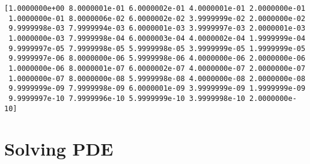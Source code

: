 \documentclass[11pt]{article}
\begin{document}
    \begin{Verbatim}[commandchars=\\\{\}]
[1.0000000e+00 8.0000001e-01 6.0000002e-01 4.0000001e-01 2.0000000e-01
 1.0000000e-01 8.0000006e-02 6.0000002e-02 3.9999999e-02 2.0000000e-02
 9.9999998e-03 7.9999994e-03 6.0000001e-03 3.9999997e-03 2.0000001e-03
 1.0000000e-03 7.9999998e-04 6.0000003e-04 4.0000002e-04 1.9999999e-04
 9.9999997e-05 7.9999998e-05 5.9999998e-05 3.9999999e-05 1.9999999e-05
 9.9999997e-06 8.0000000e-06 5.9999998e-06 4.0000000e-06 2.0000000e-06
 1.0000000e-06 8.0000001e-07 6.0000002e-07 4.0000000e-07 2.0000000e-07
 1.0000000e-07 8.0000000e-08 5.9999998e-08 4.0000000e-08 2.0000000e-08
 9.9999999e-09 7.9999998e-09 6.0000001e-09 3.9999999e-09 1.9999999e-09
 9.9999997e-10 7.9999996e-10 5.9999999e-10 3.9999998e-10 2.0000000e-10]
    \end{Verbatim}

    \hypertarget{solving-pde}{%
\section{Solving PDE}\label{solving-pde}}
\end{document}

